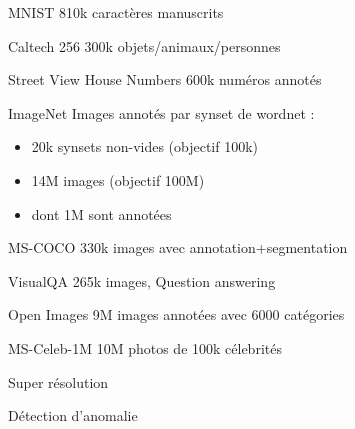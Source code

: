 \begin{frame}{MNIST}
  810k caractères manuscrits
\end{frame}

\begin{frame}{Caltech 256}
  300k objets/animaux/personnes
\end{frame}

\begin{frame}{Street View House Numbers}
  600k numéros annotés
\end{frame}

\begin{frame}{ImageNet}
  Images annotés par synset de wordnet :
  \begin{itemize}
    \item 20k synsets non-vides (objectif 100k)
    \item 14M images (objectif 100M)
    \item dont 1M sont annotées
  \end{itemize}
\end{frame}

\begin{frame}{MS-COCO}
   330k images avec annotation+segmentation
\end{frame}

\begin{frame}{VisualQA}
  265k images, Question answering
\end{frame}

\begin{frame}{Open Images}
  9M images annotées avec 6000 catégories
\end{frame}

\begin{frame}{MS-Celeb-1M}
  10M photos de 100k célebrités
\end{frame}

\begin{frame}{Super résolution}
\end{frame}

\begin{frame}{Détection d'anomalie}
\end{frame}
